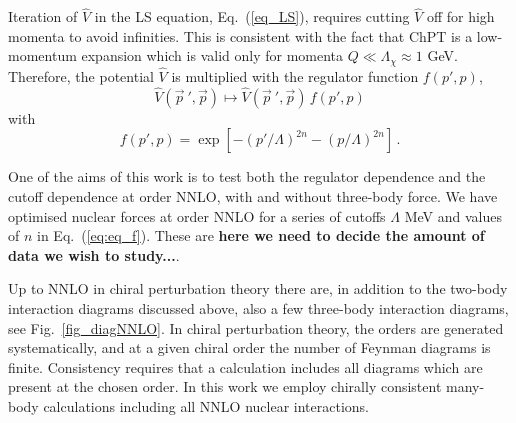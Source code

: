 \documentclass[aps,showpacs,floatfix,nofootinbib,preprintnumbers,superscriptaddress,amsmath,amssymb]{revtex4-1}
\begin{document}
Iteration of $\widehat V$ in the LS equation, Eq.~(\ref{eq_LS}),
requires cutting $\widehat V$ off for high momenta to avoid infinities.
This is consistent with the fact that ChPT
is a low-momentum expansion which
is valid only for momenta $Q \ll \Lambda_\chi \approx 1$ GeV.
Therefore, the potential $\widehat V$
is multiplied
with the regulator function $f(p',p)$,
\begin{equation}
{\widehat V}(\vec{ p}~',{\vec p})
\longmapsto
{\widehat V}(\vec{ p}~',{\vec p}) \, f(p',p) 
\end{equation}
with
\begin{equation}
f(p',p) = \exp[-(p'/\Lambda)^{2n}-(p/\Lambda)^{2n}] \,.
\label{eq:eq_f}
\end{equation}

One of the aims of this work is to test both the regulator dependence and the cutoff dependence at order NNLO, with and without 
three-body force. We have optimised nuclear forces at order NNLO for a series of cutoffs  $\Lambda$ MeV
and values of $n$ in Eq.~(\ref{eq:eq_f}). These are {\bf here we need to decide the amount of data we wish to study...}.

Up to NNLO in chiral perturbation theory there are, in addition to the
two-body interaction diagrams discussed above, also a few three-body
interaction diagrams, see Fig.~\ref{fig_diagNNLO}. In
chiral perturbation theory, the orders are generated systematically,
and at a given chiral order the number of Feynman diagrams is
finite. Consistency requires that a calculation includes all diagrams
which are present at the chosen order. In this work we employ 
chirally consistent many-body calculations including all NNLO nuclear
interactions.
\end{document}
